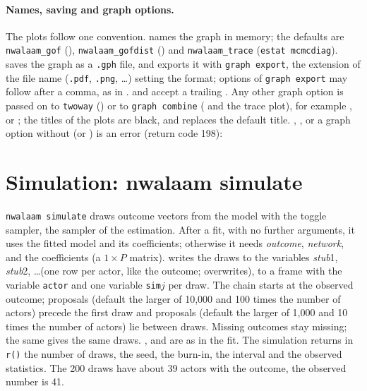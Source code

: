 \paragraph{Names, saving and graph options.} The plots follow one convention.  names the graph in memory; the defaults are \texttt{nwalaam\_gof} (), \texttt{nwalaam\_gofdist} () and \texttt{nwalaam\_trace} (\texttt{estat mcmcdiag}).  saves the graph as a \texttt{.gph} file, and  exports it with \texttt{graph export}, the extension of the file name (\texttt{.pdf}, \texttt{.png}, \dots) setting the format; options of \texttt{graph export} may follow after a comma, as in .  and  accept a trailing . Any other graph option is passed on to \texttt{twoway} () or to \texttt{graph combine} ( and the trace plot), for example ,  or ; the titles of the plots are black, and  replaces the default title. , ,  or a graph option without  (or ) is an error (return code 198):

\section{Simulation: nwalaam simulate}\label{sec:simulate}

\texttt{nwalaam simulate} draws outcome vectors from the model with the toggle sampler, the sampler of the estimation. After a fit, with no further arguments, it uses the fitted model and its coefficients; otherwise it needs \emph{outcome}, \emph{network},  and the coefficients  (a $1\times P$ matrix).  writes the draws to the variables \emph{stub}1, \emph{stub}2, \dots (one row per actor, like the outcome;  overwrites),  to a frame with the variable \texttt{actor} and one variable \texttt{sim}$j$ per draw. The chain starts at the observed outcome;  proposals (default the larger of 10,000 and 100 times the number of actors) precede the first draw and  proposals (default the larger of 1,000 and 10 times the number of actors) lie between draws. Missing outcomes stay missing; the same  gives the same draws. ,  and  are as in the fit. The simulation returns in \texttt{r()} the number of draws, the seed, the burn-in, the interval and the observed statistics.
The 200 draws have about 39 actors with the outcome, the observed number is 41.

